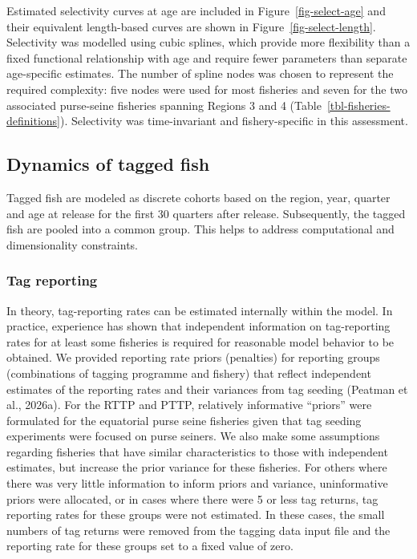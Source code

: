 \documentclass[
  english,
  a4paper,
  a4paper,
  11pt]{SCreport}
\begin{document}
Estimated selectivity curves at age are included in
Figure~\ref{fig-select-age} and their equivalent length-based curves are
shown in Figure~\ref{fig-select-length}. Selectivity was modelled using
cubic splines, which provide more flexibility than a fixed functional
relationship with age and require fewer parameters than separate
age-specific estimates. The number of spline nodes was chosen to
represent the required complexity: five nodes were used for most
fisheries and seven for the two associated purse-seine fisheries
spanning Regions 3 and 4 (Table~\ref{tbl-fisheries-definitions}).
Selectivity was time-invariant and fishery-specific in this assessment.

\subsection{Dynamics of tagged fish}\label{sec-model-tag-dynamics}

Tagged fish are modeled as discrete cohorts based on the region, year,
quarter and age at release for the first 30 quarters after release.
Subsequently, the tagged fish are pooled into a common group. This helps
to address computational and dimensionality constraints.

\subsubsection{Tag reporting}\label{sec-reporting-rate}

In theory, tag-reporting rates can be estimated internally within the
model. In practice, experience has shown that independent information on
tag-reporting rates for at least some fisheries is required for
reasonable model behavior to be obtained. We provided reporting rate
priors (penalties) for reporting groups (combinations of tagging
programme and fishery) that reflect independent estimates of the
reporting rates and their variances from tag seeding (Peatman et al.,
2026a). For the RTTP and PTTP, relatively informative ``priors'' were
formulated for the equatorial purse seine fisheries given that tag
seeding experiments were focused on purse seiners. We also make some
assumptions regarding fisheries that have similar characteristics to
those with independent estimates, but increase the prior variance for
these fisheries. For others where there was very little information to
inform priors and variance, uninformative priors were allocated, or in
cases where there were 5 or less tag returns, tag reporting rates for
these groups were not estimated. In these cases, the small numbers of
tag returns were removed from the tagging data input file and the
reporting rate for these groups set to a fixed value of zero.
\end{document}
